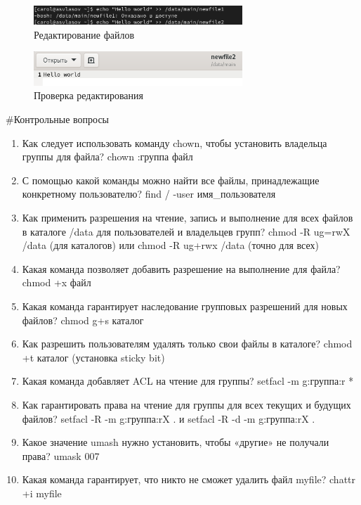 \documentclass[
  12pt,
  a4paper,
  DIV=11,
  numbers=noendperiod]{scrreprt}
\begin{document}
\begin{figure}

{\centering \includegraphics[width=0.7\textwidth,height=\textheight]{image/12.png}

}

\caption{Редактирование файлов}

\end{figure}%
\begin{figure}

{\centering \includegraphics[width=0.7\textwidth,height=\textheight]{image/13.png}

}

\caption{Проверка редактирования}

\end{figure}%

\#Контрольные вопросы

\begin{enumerate}
\def\labelenumi{\arabic{enumi}.}
\item
  Как следует использовать команду chown, чтобы установить владельца
  группы для файла? chown :группа файл
\item
  С помощью какой команды можно найти все файлы, принадлежащие
  конкретному пользователю? find / -user имя\_пользователя
\item
  Как применить разрешения на чтение, запись и выполнение для всех
  файлов в каталоге /data для пользователей и владельцев групп? chmod -R
  ug=rwX /data (для каталогов) или chmod -R ug+rwx /data (точно для
  всех)
\item
  Какая команда позволяет добавить разрешение на выполнение для файла?
  chmod +x файл
\item
  Какая команда гарантирует наследование групповых разрешений для новых
  файлов? chmod g+s каталог
\item
  Как разрешить пользователям удалять только свои файлы в каталоге?
  chmod +t каталог (установка sticky bit)
\item
  Какая команда добавляет ACL на чтение для группы? setfacl -m
  g:группа:r *
\item
  Как гарантировать права на чтение для группы для всех текущих и
  будущих файлов? setfacl -R -m g:группа:rX . и setfacl -R -d -m
  g:группа:rX .
\item
  Какое значение umash нужно установить, чтобы «другие» не получали
  права? umask 007
\item
  Какая команда гарантирует, что никто не сможет удалить файл myfile?
  chattr +i myfile
\end{enumerate}
\end{document}
